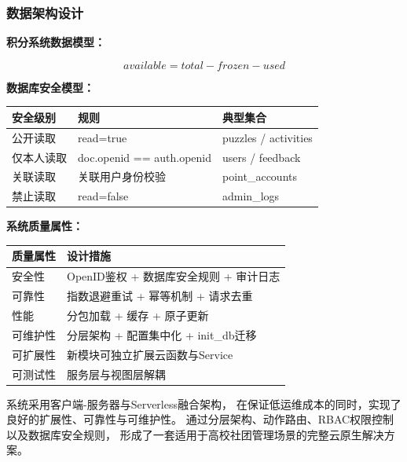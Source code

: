 \documentclass[a4paper,12pt]{article}
\begin{document}
\subsubsection{数据架构设计}

\textbf{积分系统数据模型：}

\begin{center}
\end{center}

\vspace{0.3cm}

\[
  available = total - frozen - used
\]

\textbf{数据库安全模型：}

\begin{longtable}{p{4cm} p{7cm} p{3cm}}
  \toprule
  安全级别  & 规则                        & 典型集合                 \\ \midrule
  公开读取  & read=true                 & puzzles / activities \\
  仅本人读取 & doc.openid == auth.openid & users / feedback     \\
  关联读取  & 关联用户身份校验                  & point\_accounts      \\
  禁止读取  & read=false                & admin\_logs          \\
  \bottomrule
\end{longtable}

\textbf{系统质量属性：}

\begin{longtable}{p{4cm} p{10cm}}
  \toprule
  质量属性 & 设计措施                      \\ \midrule
  安全性  & OpenID鉴权 + 数据库安全规则 + 审计日志 \\
  可靠性  & 指数退避重试 + 幂等机制 + 请求去重      \\
  性能   & 分包加载 + 缓存 + 原子更新          \\
  可维护性 & 分层架构 + 配置集中化 + init\_db迁移 \\
  可扩展性 & 新模块可独立扩展云函数与Service       \\
  可测试性 & 服务层与视图层解耦                 \\
  \bottomrule
\end{longtable}
系统采用客户端-服务器与Serverless融合架构，
在保证低运维成本的同时，实现了良好的扩展性、可靠性与可维护性。
通过分层架构、动作路由、RBAC权限控制以及数据库安全规则，
形成了一套适用于高校社团管理场景的完整云原生解决方案。
\end{document}
